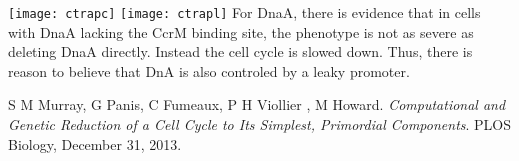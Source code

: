 \documentclass{article}
\begin{document}
\texttt{[image: ctrapc]}
\texttt{[image: ctrapl]}
\newline \newline
For DnaA, there is evidence that in cells with DnaA lacking the CcrM binding site, the phenotype is not as severe as deleting DnaA directly.  Instead the cell cycle is slowed down.  Thus, there is reason to believe that DnA is also controled by a leaky promoter.  

\begin{thebibliography}{9}
S M Murray, G Panis, C Fumeaux, P H Viollier , M Howard. 
\textit{Computational and Genetic Reduction of a Cell Cycle to Its Simplest, Primordial Components}. 
PLOS Biology, December 31, 2013.
 
\end{thebibliography}
	
\end{document}
